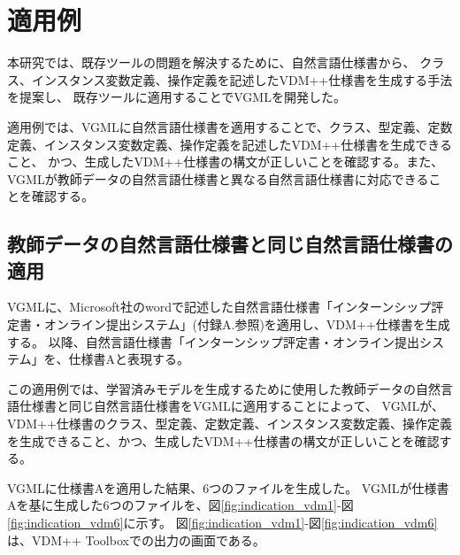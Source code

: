 \chapter{適用例}
\label{cha:Indication}

本研究では、既存ツールの問題を解決するために、自然言語仕様書から、
クラス、インスタンス変数定義、操作定義を記述したVDM++仕様書を生成する手法を提案し、
既存ツールに適用することでVGMLを開発した。

適用例では、VGMLに自然言語仕様書を適用することで、クラス、型定義、定数定義、インスタンス変数定義、操作定義を記述したVDM++仕様書を生成できること、
かつ、生成したVDM++仕様書の構文が正しいことを確認する。また、VGMLが教師データの自然言語仕様書と異なる自然言語仕様書に対応できることを確認する。

\section{教師データの自然言語仕様書と同じ自然言語仕様書の適用}
\label{sec:generate_vdm}

VGMLに、Microsoft社のwordで記述した自然言語仕様書「インターンシップ評定書・オンライン提出システム」(付録A.参照)を適用し、VDM++仕様書を生成する。
以降、自然言語仕様書「インターンシップ評定書・オンライン提出システム」を、仕様書Aと表現する。

この適用例では、学習済みモデルを生成するために使用した教師データの自然言語仕様書と同じ自然言語仕様書をVGMLに適用することによって、
VGMLが、VDM++仕様書のクラス、型定義、定数定義、インスタンス変数定義、操作定義を生成できること、かつ、生成したVDM++仕様書の構文が正しいことを確認する。

VGMLに仕様書Aを適用した結果、6つのファイルを生成した。
VGMLが仕様書Aを基に生成した6つのファイルを、図\ref{fig:indication_vdm1}-図\ref{fig:indication_vdm6}に示す。
図\ref{fig:indication_vdm1}-図\ref{fig:indication_vdm6}は、VDM++ Toolbox\cite{Tools}での出力の画面である。

